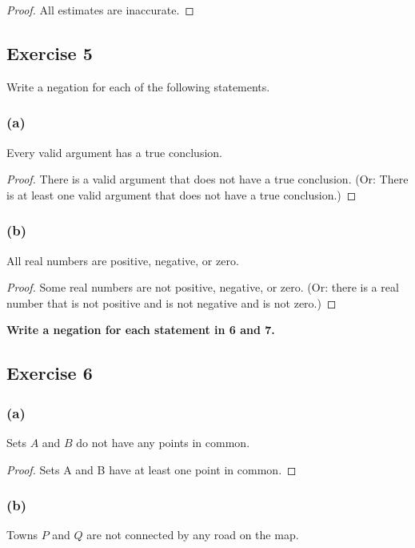 \documentclass[14pt]{extarticle}
\begin{document}
\begin{proof}
    All estimates are inaccurate.
\end{proof}

\subsection{Exercise 5}
Write a negation for each of the following statements.

\subsubsection{(a)}
Every valid argument has a true conclusion.

\begin{proof}
    There is a valid argument that does not have a true
    conclusion. (Or: There is at least one valid argument
    that does not have a true conclusion.)
\end{proof}

\subsubsection{(b)}
All real numbers are positive, negative, or zero.

\begin{proof}
    Some real numbers are not positive, negative, or zero. (Or: there is a real number that is not positive and is not negative and is not zero.)
\end{proof}

{\bf \color{cyan}Write a negation for each statement in 6 and 7.}

\subsection{Exercise 6}

\subsubsection{(a)}
Sets $A$ and $B$ do not have any points in common.

\begin{proof}
    Sets A and B have at least one point in common.
\end{proof}

\subsubsection{(b)}
Towns $P$ and $Q$ are not connected by any road on the map.
\end{document}
